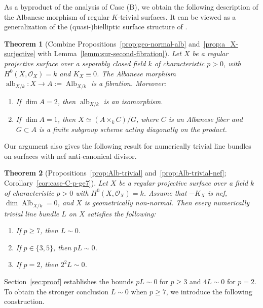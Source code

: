 \documentclass[10pt,abstract=true]{scrartcl}
\numberwithin{equation}{section}
\newtheorem{theorem}{Theorem}[section]
\theoremstyle{definition}
\theoremstyle{remark}
\DeclareMathOperator\Alb{Alb}
\DeclareMathOperator\alb{alb}
\begin{document}
As a byproduct of the analysis of Case (B), we obtain the following description of the Albanese morphism of regular $K$-trivial surfaces.
It can be viewed as a generalization of the (quasi-)bielliptic surface structure of \cite{BM-II,BM-III}.
\begin{theorem}[Combine Propositions~\ref{prop:geo-normal-alb} and~\ref{prop:a_X-surjective} with Lemma~\ref{lemm:sur-second-fibration}]\label{thm:albanese-structure-intro}
  Let $X$ be a regular projective surface over a separably closed field $k$ of characteristic $p>0$, with $H^0(X,\mathcal O_X) = k$ and $K_X \equiv 0$.
  The Albanese morphism $\alb_{X/k}\colon X\to A:=\Alb_{X/k}$ is a fibration. Moreover:
  \begin{enumerate}[label=\textup{(\arabic*)}]
    \item If $\dim A = 2$, then $\alb_{X/k}$ is an isomorphism.
    \item If $\dim A = 1$, then $X\simeq(A\times_k C)/G$, where $C$ is an Albanese fiber and $G\subset A$ is a finite subgroup scheme acting diagonally on the product.
  \end{enumerate}
\end{theorem}

Our argument also gives the following result for numerically trivial line bundles on surfaces with nef anti-canonical divisor.
\begin{theorem}[{Propositions~\ref{prop:Alb-trivial} and~\ref{prop:Alb-trivial-nef}; Corollary~\ref{cor:case-C-p-ge7}}]\label{thm:nef-anticanonical}
  Let $X$ be a regular projective surface over a field $k$ of characteristic $p > 0$ with $H^0(X,\mathcal O_X) = k$.
  Assume that $-K_X$ is nef, $\dim \Alb_{X/k} = 0$, and $X$ is geometrically non-normal.
  Then every numerically trivial line bundle $L$ on $X$ satisfies the following:
  \begin{enumerate}[label=\textup{(\arabic*)}]
    \item If $p \ge 7$, then $L \sim 0$.
    \item If $p\in\{3,5\}$, then $pL\sim0$.
    \item If $p = 2$, then $2^2L \sim 0$.
  \end{enumerate}
\end{theorem}

Section~\ref{sec:proof} establishes the bounds $pL\sim0$ for $p\ge3$ and $4L\sim0$ for $p=2$.
To obtain the stronger conclusion $L\sim0$ when $p\ge7$, we introduce the following construction.
\end{document}
